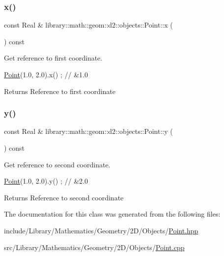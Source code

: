 \subsubsection{\texorpdfstring{x()}{x()}}
{\footnotesize\ttfamily const Real \& library\+::math\+::geom\+::d2\+::objects\+::\+Point\+::x (\begin{DoxyParamCaption}{ }\end{DoxyParamCaption}) const}



Get reference to first coordinate. 


\begin{DoxyCode}
\hyperlink{classlibrary_1_1math_1_1geom_1_1d2_1_1objects_1_1_point_a4998aefdf80bdfd967f21d49fa050398}{Point}(1.0, 2.0).x() ; \textcolor{comment}{// &1.0}
\end{DoxyCode}


\begin{DoxyReturn}{Returns}
Reference to first coordinate 
\end{DoxyReturn}
\mbox{\label{classlibrary_1_1math_1_1geom_1_1d2_1_1objects_1_1_point_a088e03daba1ed10a0a3e575ffd1d82fa}} 
\subsubsection{\texorpdfstring{y()}{y()}}
{\footnotesize\ttfamily const Real \& library\+::math\+::geom\+::d2\+::objects\+::\+Point\+::y (\begin{DoxyParamCaption}{ }\end{DoxyParamCaption}) const}



Get reference to second coordinate. 


\begin{DoxyCode}
\hyperlink{classlibrary_1_1math_1_1geom_1_1d2_1_1objects_1_1_point_a4998aefdf80bdfd967f21d49fa050398}{Point}(1.0, 2.0).y() ; \textcolor{comment}{// &2.0}
\end{DoxyCode}


\begin{DoxyReturn}{Returns}
Reference to second coordinate 
\end{DoxyReturn}


The documentation for this class was generated from the following files\+:\begin{DoxyCompactItemize}
\item 
include/\+Library/\+Mathematics/\+Geometry/2\+D/\+Objects/\hyperlink{2_d_2_objects_2_point_8hpp}{Point.\+hpp}\item 
src/\+Library/\+Mathematics/\+Geometry/2\+D/\+Objects/\hyperlink{2_d_2_objects_2_point_8cpp}{Point.\+cpp}\end{DoxyCompactItemize}
